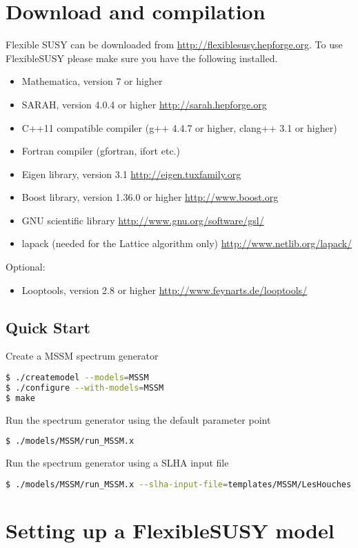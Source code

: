 \documentclass[final,3p,times,pdflatex]{elsarticle}
\begin{document}
\section{Download and compilation}
Flexible SUSY can be downloaded from \url{http://flexiblesusy.hepforge.org}.  
To use FlexibleSUSY please make sure you have the following installed.  
\begin{itemize}
\item Mathematica, version 7 or higher
\item SARAH, version 4.0.4 or higher \url{http://sarah.hepforge.org}
\item C++11 compatible compiler (g++ 4.4.7 or higher, clang++ 3.1 or
  higher)
\item Fortran compiler (gfortran, ifort etc.)
\item Eigen library, version 3.1 \url{http://eigen.tuxfamily.org}
\item Boost library, version 1.36.0 or higher
  \url{http://www.boost.org}
\item GNU scientific library \url{http://www.gnu.org/software/gsl/}
\item lapack (needed for the Lattice algorithm only)
  \url{http://www.netlib.org/lapack/}
\end{itemize}
%
Optional:
%
\begin{itemize}
\item Looptools, version 2.8 or higher
  \url{http://www.feynarts.de/looptools/}
\end{itemize}

\subsection{Quick Start}
Create a MSSM spectrum generator
  \begin{lstlisting}[language=bash]
$ ./createmodel --models=MSSM
$ ./configure --with-models=MSSM
$ make
  \end{lstlisting}
Run the spectrum generator using the default parameter point
  \begin{lstlisting}[language=bash]
$ ./models/MSSM/run_MSSM.x
  \end{lstlisting}
Run the spectrum generator using a SLHA input file
  \begin{lstlisting}[language=bash]
$ ./models/MSSM/run_MSSM.x --slha-input-file=templates/MSSM/LesHouches.in.MSSM --slha-output-file=LesHouches.out.MSSM
  \end{lstlisting}%

\section{Setting up a FlexibleSUSY model}
\end{document}
